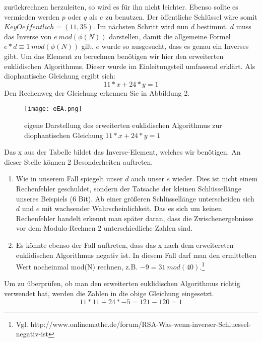 zurückrechnen herzuleiten, so wird es für ihn nicht leichter. Ebenso sollte es
vermieden werden $p$ oder $q$ als $e$ zu benutzen.
\newline\newline
Der öffentliche Schlüssel wäre somit $KeyOeffentlich = (11, 35)$.
\newline\newline
Im nächsten Schritt wird nun $d$ bestimmt. $d$ muss das Inverse von $e \
mod(\phi(N))$ darstellen, damit die allgemeine Formel $e*d \equiv 1 \
mod(\phi(N))$ gilt.
$e$ wurde so ausgesucht, dass es genau ein Inverses gibt. Um das Element zu berechnen
benötigen wir hier den erweiterten euklidischen Algorithmus. Dieser wurde im
Einleitungsteil umfassend erklärt. Als diophantische Gleichung ergibt sich:
\begin{displaymath}
11*x + 24 * y = 1
\end{displaymath}
Den Rechenweg der Gleichung erkennen Sie in Abbildung 2.\newline
\begin{figure}[H]
\texttt{[image: eEA.png]}
\caption[erweiterter euklidischer Algorithmus (Beispiel)]{eigene Darstellung
des erweiterten euklidischen Algorithmus zur diophantischen Gleichung $11*x +
24*y = 1$}
\end{figure}
Das x aus der Tabelle bildet das Inverse-Element, welches wir benötigen. An
dieser Stelle können 2 Besonderheiten auftreten.
\begin{enumerate}
  \item Wie in unserem Fall spiegelt unser $d$ auch unser $e$ wieder. Dies ist
  nicht einem Rechenfehler geschuldet, sondern der Tatsache der kleinen
  Schlüssellänge unseres Beispiels (6 Bit). Ab einer größeren Schlüssellänge
  unterscheiden sich $d$ und $e$ mit wachsender Wahrscheinlichkeit. Das es sich
  um keinen Rechenfehler handelt erkennt man später daran, dass die
  Zwischenergebnisse vor dem Modulo-Rechnen 2 unterschiedliche Zahlen sind.
  \item Es könnte ebenso der Fall auftreten, dass das x nach dem
  erweitereten euklidischen Algorithmus negativ ist. In diesem Fall darf man
  den ermittelten Wert nocheinmal mod(N) rechnen, z.B. $-9 = 31 \ mod
  (40)$.\footnote{Vgl.
  http://www.onlinemathe.de/forum/RSA-Was-wenn-inverser-Schluessel-negativ-ist}
\end{enumerate}
Um zu überprüfen, ob man den erweiterten euklidischen Algorithmus richtig
verwendet hat, werden die Zahlen in die obige Gleichung eingesetzt.
\begin{displaymath}
11*11 + 24 * -5 = 121 - 120 = 1
\end{displaymath}
